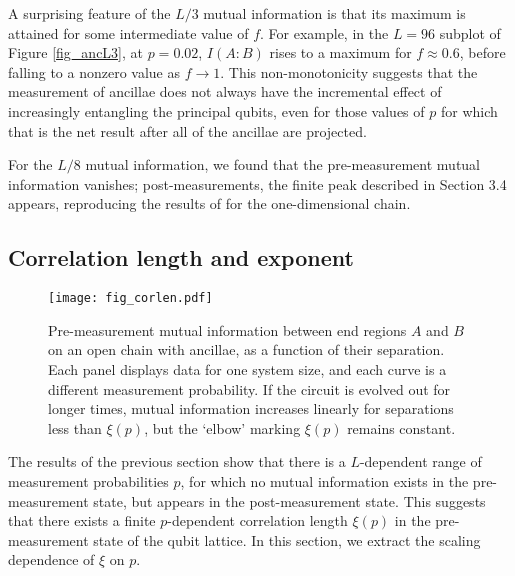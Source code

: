\documentclass[10pt]{article}
\begin{document}
A surprising feature of the $L/3$ mutual information is that its maximum is attained for some intermediate value of $f$. For example, in the $L=96$ subplot of Figure \ref{fig_ancL3}, at $p=0.02$, $I(A:B)$ rises to a maximum for $f\approx0.6$, before falling to a nonzero value as $f\rightarrow1$. This non-monotonicity suggests that the measurement of ancillae does not always have the incremental effect of increasingly entangling the principal qubits, even for those values of $p$ for which that is the net result after all of the ancillae are projected.



For the $L/8$ mutual information, we found that the pre-measurement mutual information vanishes; post-measurements, the finite peak described in Section 3.4 appears, reproducing the results of \cite{li2019measurement} for the one-dimensional chain. 




\subsection{Correlation length and exponent}

\begin{figure}
\centering
\texttt{[image: fig\_corlen.pdf]}
\caption{Pre-measurement mutual information between end regions $A$ and $B$ on an open chain with ancillae, as a function of their separation. Each panel displays data for one system size, and each curve is a different measurement probability. If the circuit is evolved out for longer times, mutual information increases linearly for separations less than $\xi(p)$, but the `elbow' marking $\xi(p)$ remains constant.}
\label{fig_corlen}
\end{figure}

The results of the previous section show that there is a $L$-dependent range of measurement probabilities $p$, for which no mutual information exists in the pre-measurement state, but appears in the post-measurement state. This suggests that there exists a finite $p$-dependent correlation length $\xi(p)$ in the pre-measurement state of the qubit lattice. In this section, we extract the scaling dependence of $\xi$ on $p$.
\end{document}
